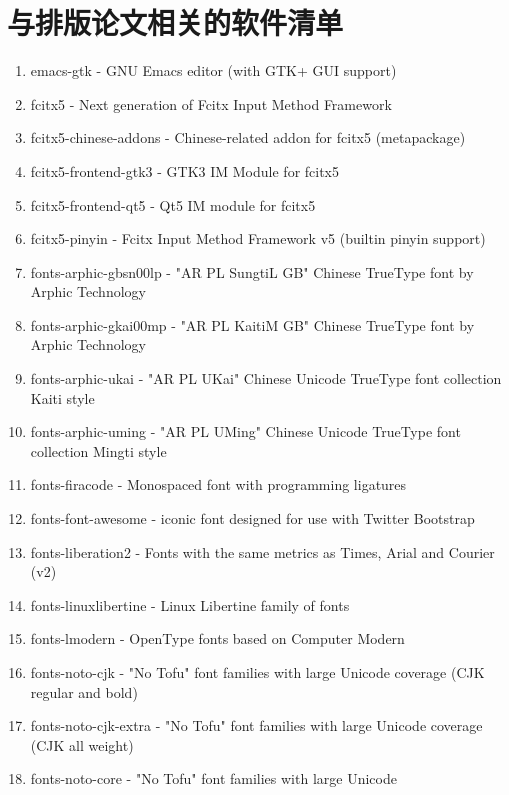 \chapter{与排版论文相关的软件清单}%
\label{app:pkg}

\begin{enumerate}
\item emacs-gtk - GNU Emacs editor (with GTK+ GUI support)
\item fcitx5 - Next generation of Fcitx Input Method Framework
\item fcitx5-chinese-addons - Chinese-related addon for fcitx5
  (metapackage)
\item fcitx5-frontend-gtk3 - GTK3 IM Module for fcitx5
\item fcitx5-frontend-qt5 - Qt5 IM module for fcitx5
\item fcitx5-pinyin - Fcitx Input Method Framework v5 (builtin pinyin
  support)
\item fonts-arphic-gbsn00lp - "AR PL SungtiL GB" Chinese TrueType font
  by Arphic Technology
\item fonts-arphic-gkai00mp - "AR PL KaitiM GB" Chinese TrueType font
  by Arphic Technology
\item fonts-arphic-ukai - "AR PL UKai" Chinese Unicode TrueType font
  collection Kaiti style
\item fonts-arphic-uming - "AR PL UMing" Chinese Unicode TrueType font
  collection Mingti style
\item fonts-firacode - Monospaced font with programming ligatures
\item fonts-font-awesome - iconic font designed for use with Twitter
  Bootstrap
\item fonts-liberation2 - Fonts with the same metrics as Times, Arial
  and Courier (v2)
\item fonts-linuxlibertine - Linux Libertine family of fonts
\item fonts-lmodern - OpenType fonts based on Computer Modern
\item fonts-noto-cjk - "No Tofu" font families with large Unicode
  coverage (CJK regular and bold)
\item fonts-noto-cjk-extra - "No Tofu" font families with large
  Unicode coverage (CJK all weight)
\item fonts-noto-core - "No Tofu" font families with large Unicode

\end{enumerate}
